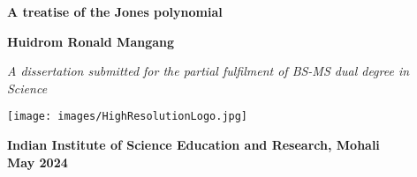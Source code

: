 \date{}

\thispagestyle{empty}

\begin{titlepage}

\begin{center}
    \LARGE
    \textbf{A treatise of the Jones polynomial}

    \vspace{1cm}
    \Large
    \textbf{Huidrom Ronald Mangang}
    \vspace{1cm}
    
    \large
    \textit{A dissertation submitted for the partial fulfilment of
    BS-MS dual degree in Science}
    
    \vspace{3.5cm}

    \texttt{[image: images/HighResolutionLogo.jpg]}

    \large
    \textbf{Indian Institute of Science Education and Research, Mohali}\\
    \large
    \textbf{May 2024}
\end{center}

\end{titlepage}

\thispagestyle{empty}
\cleardoublepage
